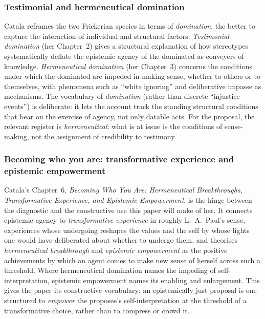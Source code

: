 \subsubsection{Testimonial and hermeneutical domination}

Catala reframes the two Frickerian species in terms of \emph{domination}, the better to capture the interaction of individual and structural factors. \emph{Testimonial domination} (her Chapter~2) gives a structural explanation of how stereotypes systematically deflate the epistemic agency of the dominated as conveyers of knowledge. \emph{Hermeneutical domination} (her Chapter~3) concerns the conditions under which the dominated are impeded in making sense, whether to others or to themselves, with phenomena such as ``white ignoring'' and deliberative impasse as mechanisms. The vocabulary of \emph{domination} (rather than discrete ``injustice events'') is deliberate: it lets the account track the standing structural conditions that bear on the exercise of agency, not only datable acts. For the proposal, the relevant register is \emph{hermeneutical}: what is at issue is the conditions of sense-making, not the assignment of credibility to testimony.

\subsubsection{Becoming who you are: transformative experience and epistemic empowerment}

Catala's Chapter~6, \emph{Becoming Who You Are: Hermeneutical Breakthroughs, Transformative Experience, and Epistemic Empowerment}, is the hinge between the diagnostic and the constructive use this paper will make of her. It connects epistemic agency to \emph{transformative experience} in roughly L.~A.\ Paul's sense, experiences whose undergoing reshapes the values and the self by whose lights one would have deliberated about whether to undergo them, and theorises \emph{hermeneutical breakthrough} and \emph{epistemic empowerment} as the positive achievements by which an agent comes to make new sense of herself across such a threshold. Where hermeneutical domination names the impeding of self-interpretation, epistemic empowerment names its enabling and enlargement. This gives the paper its constructive vocabulary: an epistemically just proposal is one structured to \emph{empower} the proposee's self-interpretation at the threshold of a transformative choice, rather than to compress or crowd it.

